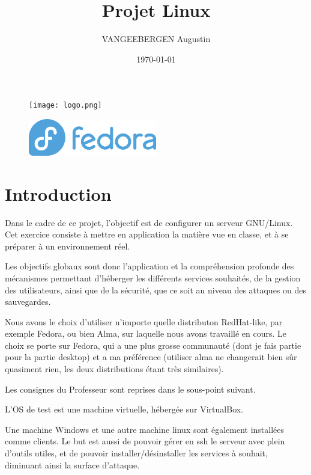 \documentclass{article}
\title{Projet Linux}
\author{VANGEEBERGEN Augustin}
\date{\today}
\begin{document}
	
	\maketitle
	
	\begin{figure}[h]
		\centering
		\texttt{[image: logo.png]}
		\label{fig:logoheh}
	\end{figure}
	
	\begin{figure}[h!]
		\centering
		\includegraphics[width=0.5\textwidth]{fedora.png}
		\label{fig:logoheh}
	\end{figure}
	

	
	\newpage


	\tableofcontents
	\newpage
	

	
\section{Introduction}
Dans le cadre de ce projet, l'objectif est de configurer un serveur GNU/Linux. Cet exercice consiste à mettre en application la matière vue en classe, et à se préparer à un environnement réel.
	
Les objectifs globaux sont donc l'application et la compréhension profonde des mécanismes permettant d'héberger les différents services souhaités, de la gestion des utilisateurs, ainsi que de la sécurité, que ce soit au niveau des attaques ou des sauvegardes.

Nous avons le choix d'utiliser n'importe quelle distributon RedHat-like, par exemple Fedora, ou bien Alma, sur laquelle nous avons travaillé en cours.
Le choix se porte sur Fedora, qui a une plus grosse communauté (dont je fais partie pour la partie desktop) et a ma préférence (utiliser alma ne changerait bien sûr quasiment rien, les deux distributions étant très similaires).

	
Les consignes du Professeur sont reprises dans le sous-point suivant.

	
L'OS de test est une machine virtuelle, hébergée sur VirtualBox. 
	
Une machine Windows et une autre machine linux sont également installées comme clients.
Le but est aussi de pouvoir gérer en ssh le serveur avec plein d'outils utiles, et de pouvoir installer/désinstaller les services à souhait, diminuant ainsi la surface d'attaque.
	
\end{document}
